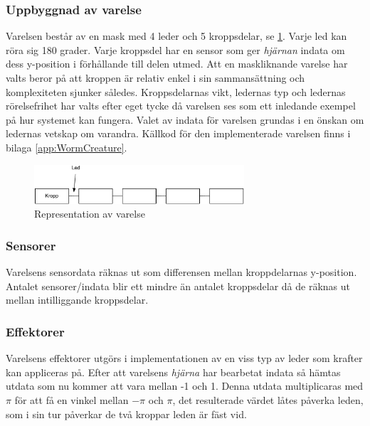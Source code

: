 \documentclass[titlepage, twocolumn, a4paper, 12pt, swedish]{article}
\begin{document}
\subsubsection{Uppbyggnad av varelse}\label{sec:uppbyggnadVarelse}
Varelsen består av en mask med 4 leder och 5 kroppsdelar, se \ref{fig:creature.pdf}. Varje led kan röra sig 180 grader. Varje kroppsdel har en sensor som ger \textit{hjärnan} indata om dess y-position i förhållande till delen utmed. Att en maskliknande varelse har valts beror på att kroppen är relativ enkel i sin sammansättning och komplexiteten sjunker således. Kroppsdelarnas vikt, ledernas typ och ledernas rörelsefrihet har valts efter eget tycke då varelsen ses som ett inledande exempel på hur systemet kan fungera. Valet av indata för varelsen grundas i en önskan om ledernas vetskap om varandra. Källkod för den implementerade varelsen finns i bilaga \ref{app:WormCreature}.

\begin{figure}
  \begin{center}
    \includegraphics[width=78mm]{images/creature.pdf}
    \caption{Representation av varelse}
    \label{fig:creature.pdf}
  \end{center}
\end{figure}

\subsubsection{Sensorer}
Varelsens sensordata räknas ut som differensen mellan kroppdelarnas y-position. Antalet sensorer/indata blir ett mindre än antalet kroppsdelar då de räknas ut mellan intilliggande kroppsdelar. 

\subsubsection{Effektorer}
Varelsens effektorer utgörs i implementationen av en viss typ av leder som krafter kan appliceras på. Efter att varelsens \textit{hjärna} har bearbetat indata så hämtas utdata som nu kommer att vara mellan -1 och 1. Denna utdata multiplicaras med $\pi$ för att få en vinkel mellan $-\pi$ och $\pi$, det resulterade värdet låtes påverka leden, som i sin tur påverkar de två kroppar leden är fäst vid.
\end{document}
